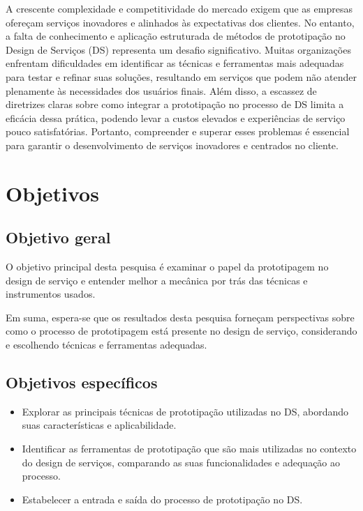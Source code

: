 A crescente complexidade e competitividade do mercado exigem que as empresas ofereçam serviços inovadores e alinhados às expectativas dos clientes. No entanto, a falta de conhecimento e aplicação estruturada de métodos de prototipação no Design de Serviços (DS) representa um desafio significativo. Muitas organizações enfrentam dificuldades em identificar as técnicas e ferramentas mais adequadas para testar e refinar suas soluções, resultando em serviços que podem não atender plenamente às necessidades dos usuários finais. Além disso, a escassez de diretrizes claras sobre como integrar a prototipação no processo de DS limita a eficácia dessa prática, podendo levar a custos elevados e experiências de serviço pouco satisfatórias. Portanto, compreender e superar esses problemas é essencial para garantir o desenvolvimento de serviços inovadores e centrados no cliente.

\section {Objetivos}
\subsection{Objetivo geral}

O objetivo principal desta pesquisa é examinar o papel da prototipagem no design de serviço e entender melhor a mecânica por trás das técnicas e instrumentos usados.

Em suma, espera-se que os resultados desta pesquisa forneçam perspectivas sobre como o processo de prototipagem está presente no design de serviço, considerando e escolhendo técnicas e ferramentas adequadas.

\subsection{Objetivos específicos}

\begin{itemize}
	\item Explorar as principais técnicas de prototipação utilizadas no DS, abordando suas características e aplicabilidade.
	
	\item Identificar as ferramentas de prototipação que são mais utilizadas no contexto do design de serviços, comparando as suas funcionalidades e adequação ao processo.
	
	\item Estabelecer a entrada e saída do processo de prototipação no DS.%
\end{itemize}

